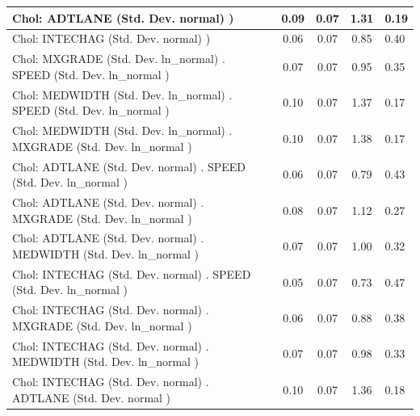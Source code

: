 \begin{table}
\begin{center}
\begin{tabular}{|l|l|c|c|c|l|}
			\hline
			 Chol: ADTLANE (Std. Dev. normal) ) &  & 0.09 & 0.07 & 1.31 & 0.19 \\
			\hline
			 Chol: INTECHAG (Std. Dev. normal) ) &  & 0.06 & 0.07 & 0.85 & 0.40 \\
			\hline
			 Chol: MXGRADE (Std. Dev. ln_normal) . SPEED (Std. Dev.   ln_normal ) &  & 0.07 & 0.07 & 0.95 & 0.35 \\
			\hline
			 Chol: MEDWIDTH (Std. Dev. ln_normal) . SPEED (Std. Dev.   ln_normal ) &  & 0.10 & 0.07 & 1.37 & 0.17 \\
			\hline
			 Chol: MEDWIDTH (Std. Dev. ln_normal) . MXGRADE (Std. Dev.   ln_normal ) &  & 0.10 & 0.07 & 1.38 & 0.17 \\
			\hline
			 Chol: ADTLANE (Std. Dev. normal) . SPEED (Std. Dev.   ln_normal ) &  & 0.06 & 0.07 & 0.79 & 0.43 \\
			\hline
			 Chol: ADTLANE (Std. Dev. normal) . MXGRADE (Std. Dev.   ln_normal ) &  & 0.08 & 0.07 & 1.12 & 0.27 \\
			\hline
			 Chol: ADTLANE (Std. Dev. normal) . MEDWIDTH (Std. Dev.   ln_normal ) &  & 0.07 & 0.07 & 1.00 & 0.32 \\
			\hline
			 Chol: INTECHAG (Std. Dev. normal) . SPEED (Std. Dev.   ln_normal ) &  & 0.05 & 0.07 & 0.73 & 0.47 \\
			\hline
			 Chol: INTECHAG (Std. Dev. normal) . MXGRADE (Std. Dev.   ln_normal ) &  & 0.06 & 0.07 & 0.88 & 0.38 \\
			\hline
			 Chol: INTECHAG (Std. Dev. normal) . MEDWIDTH (Std. Dev.   ln_normal ) &  & 0.07 & 0.07 & 0.98 & 0.33 \\
			\hline
			 Chol: INTECHAG (Std. Dev. normal) . ADTLANE (Std. Dev.   normal ) &  & 0.10 & 0.07 & 1.36 & 0.18 \\
			\hline
		\end{tabular}
	\end{center}
\end{table}